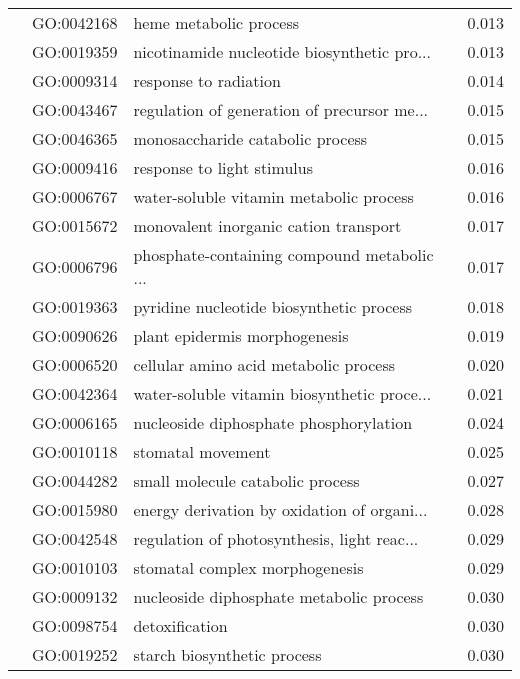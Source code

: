 \begin{longtable}{lllr}
   & GO:0042168 &                       heme metabolic process &         0.013 \\
   & GO:0019359 &  nicotinamide nucleotide biosynthetic pro... &         0.013 \\
   & GO:0009314 &                        response to radiation &         0.014 \\
   & GO:0043467 &  regulation of generation of precursor me... &         0.015 \\
   & GO:0046365 &             monosaccharide catabolic process &         0.015 \\
   & GO:0009416 &                   response to light stimulus &         0.016 \\
   & GO:0006767 &      water-soluble vitamin metabolic process &         0.016 \\
   & GO:0015672 &        monovalent inorganic cation transport &         0.017 \\
   & GO:0006796 &  phosphate-containing compound metabolic ... &         0.017 \\
   & GO:0019363 &     pyridine nucleotide biosynthetic process &         0.018 \\
   & GO:0090626 &                plant epidermis morphogenesis &         0.019 \\
   & GO:0006520 &        cellular amino acid metabolic process &         0.020 \\
   & GO:0042364 &  water-soluble vitamin biosynthetic proce... &         0.021 \\
   & GO:0006165 &       nucleoside diphosphate phosphorylation &         0.024 \\
   & GO:0010118 &                            stomatal movement &         0.025 \\
   & GO:0044282 &             small molecule catabolic process &         0.027 \\
   & GO:0015980 &  energy derivation by oxidation of organi... &         0.028 \\
   & GO:0042548 &  regulation of photosynthesis, light reac... &         0.029 \\
   & GO:0010103 &               stomatal complex morphogenesis &         0.029 \\
   & GO:0009132 &     nucleoside diphosphate metabolic process &         0.030 \\
   & GO:0098754 &                               detoxification &         0.030 \\
   & GO:0019252 &                  starch biosynthetic process &         0.030 \\

\end{longtable}
